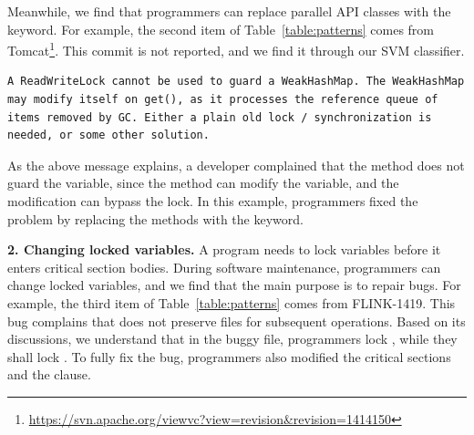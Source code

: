 

Meanwhile, we find that programmers can replace parallel API classes with the  keyword. For example, the second item of Table~\ref{table:patterns} comes from Tomcat\footnote{\url{https://svn.apache.org/viewvc?view=revision&revision=1414150}}. This commit is not reported, and we find it through our SVM classifier.%

\begin{lstlisting}
A ReadWriteLock cannot be used to guard a WeakHashMap. The WeakHashMap may modify itself on get(), as it processes the reference queue of items removed by GC. Either a plain old lock / synchronization is needed, or some other solution.
\end{lstlisting}

As the above message explains, a developer complained that the  method does not guard the  variable, since the  method can modify the  variable, and the modification can bypass the lock. In this example, programmers fixed the problem by replacing the methods with the  keyword.%


\noindent
\textbf{2. Changing locked variables.} A program needs to lock variables before it enters critical section bodies. During software maintenance, programmers can change locked variables, and we find that the main purpose is to repair bugs. For example, the third item of Table~\ref{table:patterns} comes from FLINK-1419. This bug complains that  does not preserve files for subsequent operations. Based on its discussions, we understand that in the buggy file, programmers lock , while they shall lock . To fully fix the bug, programmers also modified the critical sections and the  clause.

